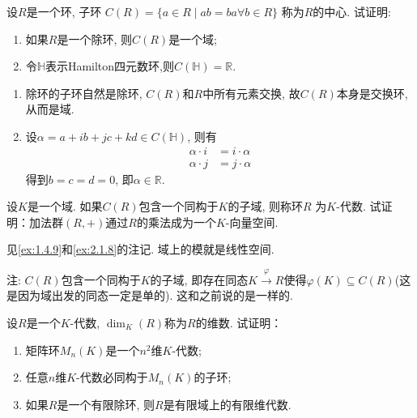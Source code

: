 \begin{problem}\label{ex:2.1.11}
    设$R$是一个环, 子环
$C(R) = \{a \in R \mid ab = ba \forall b \in R\}$
称为$R$的中心. 试证明:
\begin{enumerate}[(1)]
    \item 如果$R$是一个除环, 则$C(R)$是一个域;
    \item 令$\mathbb{H}$表示Hamilton四元数环,则$C(\mathbb{H}) = \mathbb{R}$.
\end{enumerate}
\end{problem}

\begin{solution}
    \begin{enumerate}[(1)]
        \item 除环的子环自然是除环, $C(R)$和$R$中所有元素交换, 故$C(R)$本身是交换环, 从而是域.
        \item 设$\alpha = a + ib + jc + kd \in C(\mathbb{H})$, 则有
        \[
        \begin{aligned}
            \alpha \cdot i &= i \cdot \alpha\\
            \alpha \cdot j &= j \cdot \alpha
        \end{aligned}
        \]
        得到$b = c = d = 0$, 即$\alpha \in \mathbb{R}$.
    \end{enumerate}
\end{solution}

\begin{problem}\label{ex:2.1.12}
    设$K$是一个域. 如果$C(R)$包含一个同构于$K$的子域, 则称环$R$
为$K$-代数. 试证明：加法群$(R, +)$通过$R$的乘法成为一个$K$-向量空间.
\end{problem}

\begin{solution}
    见\ref{ex:1.4.9}和\ref{ex:2.1.8}的注记. 域上的模就是线性空间.

注: $C(R)$包含一个同构于$K$的子域, 即存在同态$K \overset{\varphi}\to R$使得$\varphi(K) \subseteq C(R)$(这是因为域出发的同态一定是单的). 这和之前说的是一样的.
\end{solution}

\begin{problem}
    设$R$是一个$K$-代数, $\dim_K(R)$称为$R$的维数.
试证明：
\begin{enumerate}[(1)]
    \item 矩阵环$M_n(K)$是一个$n^2$维$K$-代数;
    \item 任意$n$维$K$-代数必同构于$M_n(K)$的子环;
    \item 如果$R$是一个有限除环, 则$R$是有限域上的有限维代数.
\end{enumerate}
\end{problem}

